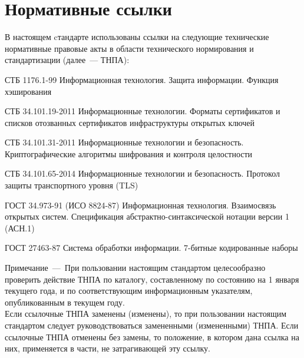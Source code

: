 \chapter{Нормативные ссылки}

В настоящем cтандарте использованы ссылки на следующие 
технические нормативные правовые акты в области 
технического нормирования и стандартизации (далее~--- ТНПА):

СТБ 1176.1-99 Информационная технология. Защита информации.
Функция хэширования

СТБ 34.101.19-2011 Информационные технологии. 
Форматы сертификатов и списков отозванных сертификатов 
инфраструктуры открытых ключей

СТБ 34.101.31-2011 Информационные технологии и безопасность. 
Криптографические алгоритмы шифрования и контроля целостности

СТБ 34.101.65-2014 Информационные технологии и безопасность. 
Протокол защиты транспортного уровня (TLS)

ГОСТ 34.973-91 (ИСО 8824-87) Информационная технология. Взаимосвязь
открытых систем. Спецификация абстрактно-синтаксической нотации
версии 1 (АСН.1)

ГОСТ 27463-87 Система обработки информации. 7-битные кодированные наборы 

\begin{list}{}
{\setlength{\labelwidth}{0pt}\setlength{\topsep}{0pt}
\setlength{\partopsep}{0pt}\setlength{\parskip}{0pt}
\setlength{\itemindent}{0pt}\setlength{\leftmargin}{\parindent}
\setlength{\labelsep}{0pt}}
\item[]
{\small Примечание~---~При пользовании настоящим стандартом
целесообразно проверить действие ТНПА по каталогу, 
составленному по состоянию на 1 января текущего
года, и по соответствующим информационным указателям, опубликованным
в текущем году.\\
Если ссылочные ТНПА заменены (изменены), то при
пользовании настоящим стандартом следует руководствоваться
замененными (измененными) ТНПА. Если ссылочные ТНПА отменены без
замены, то положение, в котором дана ссылка на них, применяется в
части, не затрагивающей эту ссылку.
}
\end{list}

